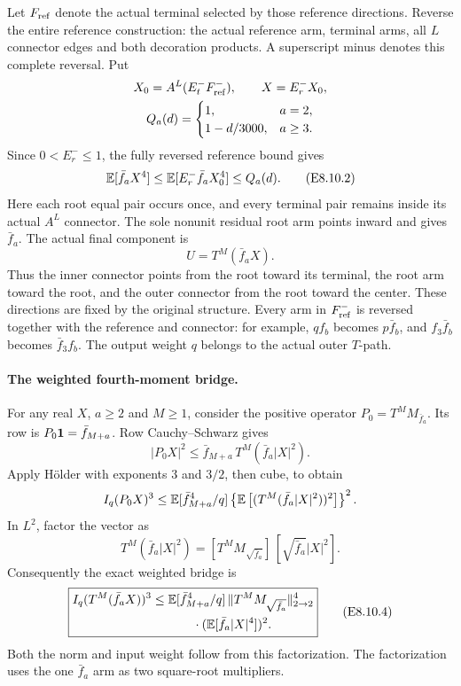 Let \(F_{\rm ref}\) denote the actual terminal selected by those
reference directions. Reverse the entire reference construction:
the actual reference arm, terminal arms, all \(L\) connector edges and
both decoration products. A superscript minus denotes this complete
reversal. Put
\[
\begin{gathered}
X_0=A^L(E_t^-F_{\rm ref}^-),\qquad X=E_r^-X_0,\\
Q_a(d)=
\begin{cases}
1,&a=2,\\
1-d/3000,&a\ge3.
\end{cases}
\end{gathered}
\]
Since \(0<E_r^-\le1\), the fully reversed reference bound gives
\[
\mathbb E[\bar f_aX^4]
\le\mathbb E[E_r^-\bar f_aX_0^4]\le Q_a(d).
\tag{E8.10.2}
\]
Here each root equal pair occurs once, and every terminal pair remains
inside its actual \(A^L\) connector. The sole nonunit residual root arm
points inward and gives \(\bar f_a\). The actual final component is
\[
U=T^M(\bar f_aX).
\tag{E8.10.3}
\]
Thus the inner connector points from the root toward its terminal, the
root arm toward the root, and the outer connector from the root toward
the center. These directions are fixed by the original structure.
Every arm in \(F_{\rm ref}^-\) is reversed together with the reference
and connector: for example, \(qf_b\) becomes \(p\bar f_b\), and
\(f_3\bar f_b\) becomes \(\bar f_3f_b\). The output weight \(q\)
belongs to the actual outer \(T\)-path.

\paragraph{The weighted fourth-moment bridge.}
For any real \(X\), \(a\ge2\) and \(M\ge1\), consider the positive
operator \(P_0=T^MM_{\bar f_a}\). Its row is
\(P_0\mathbf1=\bar f_{M+a}\). Row Cauchy--Schwarz gives
\[
|P_0X|^2\le\bar f_{M+a}\,T^M(\bar f_a|X|^2).
\]
Apply H\"older with exponents \(3\) and \(3/2\), then cube, to obtain
\[
I_q(P_0X)^3
\le\mathbb E[\bar f_{M+a}^4/q]
 \left\{\mathbb E\left[(T^M(\bar f_a|X|^2))^2\right]\right\}^2.
\]
In \(L^2\), factor the vector as
\[
T^M(\bar f_a|X|^2)
=[T^MM_{\sqrt{\bar f_a}}]\,[\sqrt{\bar f_a}|X|^2].
\]
Consequently the exact weighted bridge is
\[
\boxed{
\begin{aligned}
I_q(T^M(\bar f_aX))^3
\le{}&\mathbb E[\bar f_{M+a}^4/q]\,
 \lVert T^MM_{\sqrt{\bar f_a}}\rVert_{2\to2}^4\\
&\hspace{2em}\cdot(\mathbb E[\bar f_a|X|^4])^2.
\end{aligned}}
\tag{E8.10.4}
\]
Both the norm and input weight follow from this factorization. The
factorization uses the one \(\bar f_a\) arm as two square-root multipliers.

